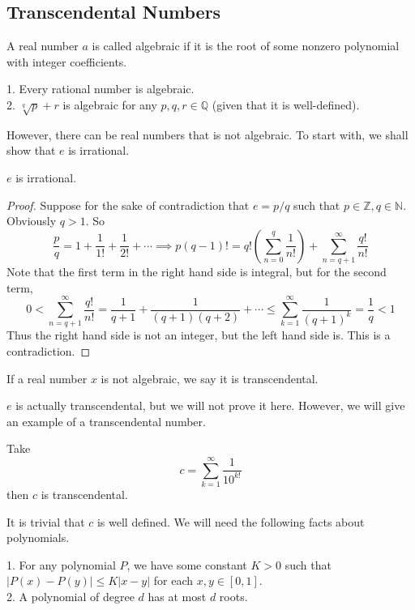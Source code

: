 \subsection{Transcendental Numbers}
\begin{definition}
    A real number $a$ is called algebraic if it is the root of some nonzero polynomial with integer coefficients.
\end{definition}
\begin{example}
    1. Every rational number is algebraic.\\
    2. $\sqrt[q]{p}+r$ is algebraic for any $p,q,r\in\mathbb Q$ (given that it is well-defined).
\end{example}
However, there can be real numbers that is not algebraic.
To start with, we shall show that $e$ is irrational.
\begin{proposition}
    $e$ is irrational.
\end{proposition}
\begin{proof}
    Suppose for the sake of contradiction that $e=p/q$ such that $p\in\mathbb Z,q\in\mathbb N$.
    Obviously $q>1$.
    So
    $$\frac{p}{q}=1+\frac{1}{1!}+\frac{1}{2!}+\cdots\implies p(q-1)!=q!\left(\sum_{n=0}^q\frac{1}{n!}\right)+\sum_{n=q+1}^\infty\frac{q!}{n!}$$
    Note that the first term in the right hand side is integral, but for the second term,
    $$0<\sum_{n=q+1}^\infty\frac{q!}{n!}=\frac{1}{q+1}+\frac{1}{(q+1)(q+2)}+\cdots\le\sum_{k=1}^\infty\frac{1}{(q+1)^k}=\frac{1}{q}<1$$
    Thus the right hand side is not an integer, but the left hand side is.
    This is a contradiction.
\end{proof}
\begin{definition}
    If a real number $x$ is not algebraic, we say it is transcendental.
\end{definition}
$e$ is actually transcendental, but we will not prove it here.
However, we will give an example of a transcendental number.
\begin{proposition}
    Take
    $$c=\sum_{k=1}^\infty \frac{1}{10^{k!}}$$
    then $c$ is transcendental.
\end{proposition}
It is trivial that $c$ is well defined.
We will need the following facts about polynomials.
\begin{proposition}
    1. For any polynomial $P$, we have some constant $K>0$ such that $|P(x)-P(y)|\le K|x-y|$ for each $x,y\in [0,1]$.\\
    2. A polynomial of degree $d$ has at most $d$ roots.
\end{proposition}
